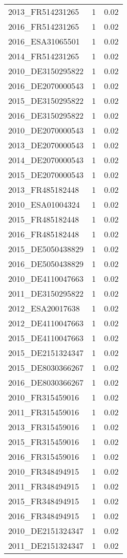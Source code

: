 \begin{table*}[htbp]
\begin{tabular}{lrr}
2013_FR514231265 & 1 & 0.02 \\
2016_FR514231265 & 1 & 0.02 \\
2016_ESA31065501 & 1 & 0.02 \\
2014_FR514231265 & 1 & 0.02 \\
2010_DE3150295822 & 1 & 0.02 \\
2016_DE2070000543 & 1 & 0.02 \\
2015_DE3150295822 & 1 & 0.02 \\
2016_DE3150295822 & 1 & 0.02 \\
2010_DE2070000543 & 1 & 0.02 \\
2013_DE2070000543 & 1 & 0.02 \\
2014_DE2070000543 & 1 & 0.02 \\
2015_DE2070000543 & 1 & 0.02 \\
2013_FR485182448 & 1 & 0.02 \\
2010_ESA01004324 & 1 & 0.02 \\
2015_FR485182448 & 1 & 0.02 \\
2016_FR485182448 & 1 & 0.02 \\
2015_DE5050438829 & 1 & 0.02 \\
2016_DE5050438829 & 1 & 0.02 \\
2010_DE4110047663 & 1 & 0.02 \\
2011_DE3150295822 & 1 & 0.02 \\
2012_ESA20017638 & 1 & 0.02 \\
2012_DE4110047663 & 1 & 0.02 \\
2015_DE4110047663 & 1 & 0.02 \\
2015_DE2151324347 & 1 & 0.02 \\
2015_DE8030366267 & 1 & 0.02 \\
2016_DE8030366267 & 1 & 0.02 \\
2010_FR315459016 & 1 & 0.02 \\
2011_FR315459016 & 1 & 0.02 \\
2013_FR315459016 & 1 & 0.02 \\
2015_FR315459016 & 1 & 0.02 \\
2016_FR315459016 & 1 & 0.02 \\
2010_FR348494915 & 1 & 0.02 \\
2011_FR348494915 & 1 & 0.02 \\
2015_FR348494915 & 1 & 0.02 \\
2016_FR348494915 & 1 & 0.02 \\
2010_DE2151324347 & 1 & 0.02 \\
2011_DE2151324347 & 1 & 0.02 \\

\end{tabular}
\end{table*}
